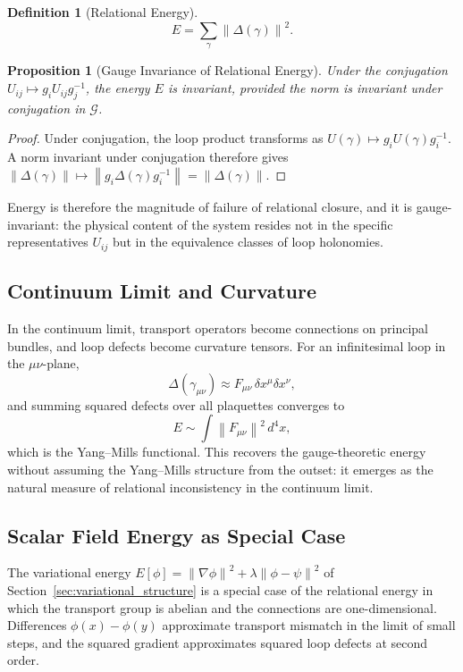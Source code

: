 \documentclass[12pt,a4paper,openany]{book}
\theoremstyle{plain}
\newtheorem{proposition}[theorem]{Proposition}
\theoremstyle{definition}
\newtheorem{definition}[theorem]{Definition}
\theoremstyle{remark}
\newcommand{\norm}[1]{\left\|#1\right\|}
\begin{document}
\begin{definition}[Relational Energy]
\[
E = \sum_\gamma \norm{\Delta(\gamma)}^2.
\]
\end{definition}

\begin{proposition}[Gauge Invariance of Relational Energy]
Under the conjugation $U_{ij} \mapsto g_i U_{ij} g_j^{-1}$, the energy $E$ is invariant, provided the norm is invariant under conjugation in $\mathcal{G}$.
\end{proposition}

\begin{proof}
Under conjugation, the loop product transforms as $U(\gamma) \mapsto g_i U(\gamma) g_i^{-1}$. A norm invariant under conjugation therefore gives $\norm{\Delta(\gamma)} \mapsto \norm{g_i\Delta(\gamma)g_i^{-1}} = \norm{\Delta(\gamma)}$.
\end{proof}

Energy is therefore the magnitude of failure of relational closure, and it is gauge-invariant: the physical content of the system resides not in the specific representatives $U_{ij}$ but in the equivalence classes of loop holonomies.

\subsection{Continuum Limit and Curvature}

In the continuum limit, transport operators become connections on principal bundles, and loop defects become curvature tensors. For an infinitesimal loop in the $\mu\nu$-plane,
\[
\Delta(\gamma_{\mu\nu}) \approx F_{\mu\nu}\,\delta x^\mu\delta x^\nu,
\]
and summing squared defects over all plaquettes converges to
\[
E \sim \int \norm{F_{\mu\nu}}^2\,d^4x,
\]
which is the Yang--Mills functional. This recovers the gauge-theoretic energy without assuming the Yang--Mills structure from the outset: it emerges as the natural measure of relational inconsistency in the continuum limit.

\subsection{Scalar Field Energy as Special Case}

The variational energy $E[\phi] = \norm{\nabla\phi}^2 + \lambda\norm{\phi-\psi}^2$ of Section~\ref{sec:variational_structure} is a special case of the relational energy in which the transport group is abelian and the connections are one-dimensional. Differences $\phi(x) - \phi(y)$ approximate transport mismatch in the limit of small steps, and the squared gradient approximates squared loop defects at second order.
\end{document}
